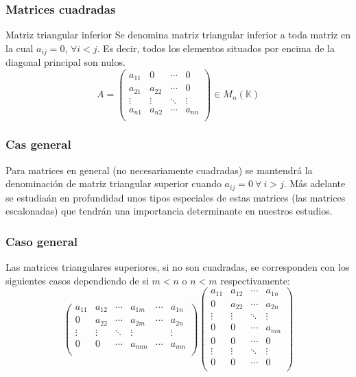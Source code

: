 \documentclass[12pt]{article}
\begin{document}
 \begin{frame}
  \frametitle{Matrices cuadradas}
   \begin{block}{Matriz triangular inferior}
Se denomina matriz triangular inferior a toda matriz en la cual  $a_{ij} = 0$,  $\forall i < j $. Es decir, todos los elementos situados por encima de la diagonal principal son nulos.
\[ A =  \left(\begin{matrix} %
      a_{11} & 0 & \cdots & 0 \\
      a_{21} & a_{22} & \cdots & 0 \\
  \vdots & \vdots & \ddots & \vdots \\
   a_{n1} & a_{n2} & \cdots & a_{nn} \\
    \end{matrix}\right) \in M_{ n} (\mathbb{K})\]
  \end{block}
 \end{frame}
 
 
  \begin{frame}
  \frametitle{Cas general}
  
Para matrices en general (no necesariamente cuadradas) se mantendr\'a la denominaci\'on de matriz triangular superior cuando $a_{ij} = 0\ \forall \ i > j$. M\'as adelante se estudia\'an en profundidad unos tipos especiales de estas matrices (las matrices escalonadas) que tendr\'an una importancia determinante en nuestros estudios.  
 \end{frame}


  \begin{frame}
  \frametitle{Caso general}
  Las matrices triangulares superiores, si no son cuadradas, se corresponden con los siguientes casos dependiendo de si $m < n$ o $n < m$ respectivamente:
\[   \left(\begin{matrix} %
      a_{11} & a_{12} & \cdots & a_{1m} & \cdots & a_{1n}  \\
      0 & a_{22} & \cdots & a_{2m} & \cdots & a_{2n} \\
  \vdots & \vdots & \ddots & \vdots & &\vdots \\
   0 & 0 & \cdots & a_{mm} & \cdots & a_{mn} \\
    \end{matrix}\right) 
     \left(\begin{matrix} %
      a_{11} & a_{12} & \cdots & a_{1n}  \\
      0 & a_{22} & \cdots & a_{2n} \\
  \vdots & \vdots & \ddots & \vdots \\
   0 & 0 & \cdots  & a_{mn} \\
   0 & 0 & \cdots  & 0 \\
     \vdots & \vdots & \ddots & \vdots \\
   0 & 0 & \cdots  & 0 \\
    \end{matrix}\right) \]
 \end{frame}
\end{document}
